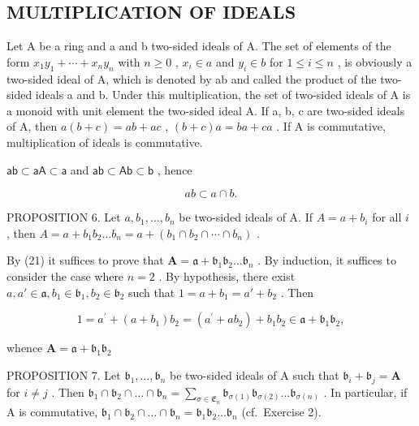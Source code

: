 \subsection{MULTIPLICATION OF IDEALS}

Let A be a ring and a and b two-sided ideals of A. The set of elements of the form \(x_{1}y_{1} + \cdots + x_{n}y_{n}\) with \(n \geqslant 0\) , \(x_{i} \in a\) and \(y_{i} \in b\) for \(1 \leqslant i \leqslant n\) , is obviously a two-sided ideal of A, which is denoted by ab and called the product of the two-sided ideals a and b. Under this multiplication, the set of two-sided ideals of A is a monoid with unit element the two-sided ideal A. If a, b, c are two-sided ideals of A, then \(a(b + c) = ab + ac\) , \((b + c)a = ba + ca\) . If A is commutative, multiplication of ideals is commutative.

\(\mathsf{ab}\subset \mathsf{aA}\subset \mathsf{a}\) and \(\mathsf{ab}\subset \mathsf{Ab}\subset \mathsf{b}\) , hence

\[
a b \subset a \cap b.\tag{21}
\]

PROPOSITION 6. Let \(a, b_{1}, \ldots, b_{n}\) be two-sided ideals of A. If \(A = a + b_{i}\) for all \(i\) , then \(A = a + b_{1}b_{2} \ldots b_{n} = a + (b_{1} \cap b_{2} \cap \cdots \cap b_{n})\) .

By (21) it suffices to prove that \(\mathbf{A} = \mathfrak{a} + \mathfrak{b}_1\mathfrak{b}_2\ldots \mathfrak{b}_n\) . By induction, it suffices to consider the case where \(n = 2\) . By hypothesis, there exist \(a, a' \in \mathfrak{a}, b_1 \in \mathfrak{b}_1, b_2 \in \mathfrak{b}_2\) such that \(1 = a + b_1 = a' + b_2\) . Then

\[
1 = a ^ {\prime} + (a + b _ {1}) b _ {2} = \left(a ^ {\prime} + a b _ {2}\right) + b _ {1} b _ {2} \in \mathfrak {a} + \mathfrak {b} _ {1} \mathfrak {b} _ {2},
\]

whence \(\mathbf{A} = \mathfrak{a} + \mathfrak{b}_1\mathfrak{b}_2\)

PROPOSITION 7. Let \(\mathfrak{b}_1, \ldots, \mathfrak{b}_n\) be two-sided ideals of A such that \(\mathfrak{b}_i + \mathfrak{b}_j = \mathbf{A}\) for \(i \neq j\) . Then \(\mathfrak{b}_1 \cap \mathfrak{b}_2 \cap \dots \cap \mathfrak{b}_n = \sum_{\sigma \in \mathfrak{E}_n} \mathfrak{b}_{\sigma(1)} \mathfrak{b}_{\sigma(2)} \ldots \mathfrak{b}_{\sigma(n)}\) . In particular, if A is commutative, \(\mathfrak{b}_1 \cap \mathfrak{b}_2 \cap \dots \cap \mathfrak{b}_n = \mathfrak{b}_1 \mathfrak{b}_2 \ldots \mathfrak{b}_n\) (cf.~Exercise 2).

